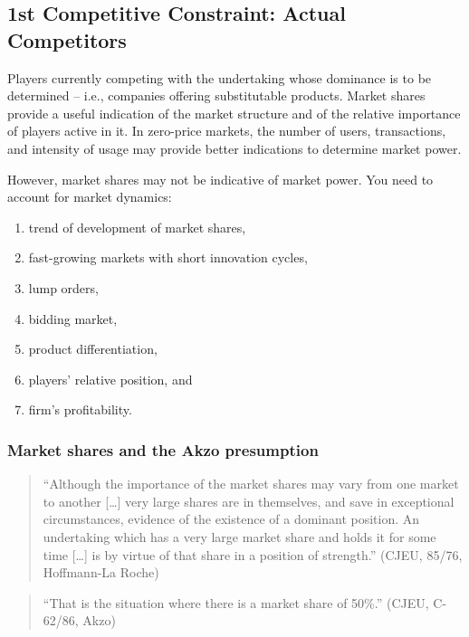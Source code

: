     \subsection{1st Competitive Constraint: Actual Competitors}

        Players currently competing with the undertaking whose dominance is to be determined – i.e., companies offering substitutable products. Market shares provide a useful indication of the market structure and of the relative importance of players active in it. In zero-price markets, the number of users, transactions, and intensity of usage may provide better indications to determine market power.
        
        However, market shares may not be indicative of market power. You need to account for market dynamics:
        \begin{enumerate}[label=\roman*.]
            \item trend of development of market shares,
            \item fast-growing markets with short innovation cycles,
            \item lump orders,
            \item bidding market,
            \item product differentiation,
            \item players’ relative position, and
            \item firm’s profitability.
        \end{enumerate}

        \subsubsection{Market shares and the Akzo presumption}

            \begin{quote}
                “Although the importance of the market shares may vary from one market to another […] very large shares are in themselves, and save in exceptional circumstances, evidence of the existence of a dominant position. An undertaking which has a very large market share and holds it for some time […] is by virtue of that share in a position of strength.” (CJEU, 85/76, Hoffmann-La Roche)
            \end{quote}
            \begin{quote}
                “That is the situation where there is a market share of 50\%.” (CJEU, C-62/86, Akzo)
            \end{quote}

